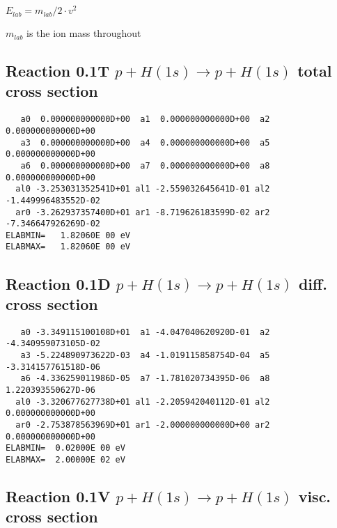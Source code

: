 \documentclass[12pt]{article}
\begin{document}
$E_{lab} = m_{lab}/2 \cdot v^2$

$m_{lab}$ is the ion mass throughout

\subsection{
Reaction 0.1T $p + H (1s) \rightarrow p + H (1s) $ total cross
section}

\begin{small}\begin{verbatim}
   a0  0.000000000000D+00  a1  0.000000000000D+00  a2  0.000000000000D+00
   a3  0.000000000000D+00  a4  0.000000000000D+00  a5  0.000000000000D+00
   a6  0.000000000000D+00  a7  0.000000000000D+00  a8  0.000000000000D+00
  al0 -3.253031352541D+01 al1 -2.559032645641D-01 al2 -1.449996483552D-02
  ar0 -3.262937357400D+01 ar1 -8.719626183599D-02 ar2 -7.346647926269D-02
ELABMIN=   1.82060E 00 eV
ELABMAX=   1.82060E 00 eV
\end{verbatim}\end{small}



\subsection{
Reaction 0.1D    $ p + H (1s) \rightarrow p + H (1s)$  diff. cross
section}


\begin{small}\begin{verbatim}
   a0 -3.349115100108D+01  a1 -4.047040620920D-01  a2 -4.340959073105D-02
   a3 -5.224890973622D-03  a4 -1.019115858754D-04  a5 -3.314157761518D-06
   a6 -4.336259011986D-05  a7 -1.781020734395D-06  a8  1.220393550627D-06
  al0 -3.320677627738D+01 al1 -2.205942040112D-01 al2  0.000000000000D+00
  ar0 -2.753878563969D+01 ar1 -2.000000000000D+00 ar2  0.000000000000D+00
ELABMIN=  0.02000E 00 eV
ELABMAX=  2.00000E 02 eV
\end{verbatim}\end{small}


\subsection{
Reaction 0.1V    $p + H (1s) \rightarrow p + H (1s)$ visc. cross section
}
\end{document}

